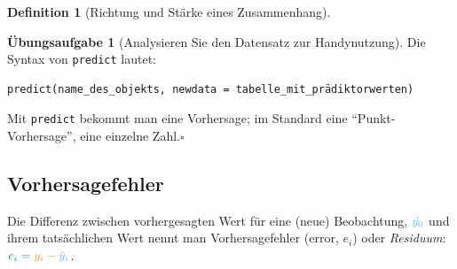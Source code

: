 \documentclass[
  a4paper,
  DIV=11]{scrreprt}
\theoremstyle{definition}
\newtheorem{exercise}{Übungsaufgabe}[chapter]
\theoremstyle{definition}
\theoremstyle{definition}
\newtheorem{definition}{Definition}[chapter]
\theoremstyle{remark}
\begin{document}
\begin{definition}[Richtung und Stärke eines
Zusammenhang]
\begin{exercise}[Analysieren Sie den Datensatz zur
Handynutzung]
Die Syntax von \texttt{predict} lautet:

\begin{verbatim}
predict(name_des_objekts, newdata = tabelle_mit_prädiktorwerten)
\end{verbatim}

\begin{tcolorbox}[enhanced jigsaw, leftrule=.75mm, opacitybacktitle=0.6, colback=white, colframe=quarto-callout-note-color-frame, coltitle=black, colbacktitle=quarto-callout-note-color!10!white, opacityback=0, left=2mm, breakable, titlerule=0mm, toptitle=1mm, bottomtitle=1mm, rightrule=.15mm, title=\textcolor{quarto-callout-note-color}{\faInfo}\hspace{0.5em}{Hinweis}, arc=.35mm, bottomrule=.15mm, toprule=.15mm]

Mit \texttt{predict} bekommt man eine Vorhersage; im Standard eine
``Punkt-Vorhersage'', eine einzelne Zahl.\(\square\)

\end{tcolorbox}

\subsection{Vorhersagefehler}\label{vorhersagefehler}

Die Differenz zwischen vorhergesagten Wert für eine (neue) Beobachtung,
\(\color{modelcol}{\hat{y_0}}\) und ihrem tatsächlichen Wert nennt man
Vorhersagefehler (error, \(e_i\)) oder \emph{Residuum}:
\(\color{errorcol}{e_i} = \color{ycol}{y_i} - \color{modelcol}{\hat{y}_i}\).

\begin{figure}

\begin{minipage}{0.50\linewidth}

\end{minipage}
\end{figure}
\end{exercise}
\end{definition}
\end{document}
